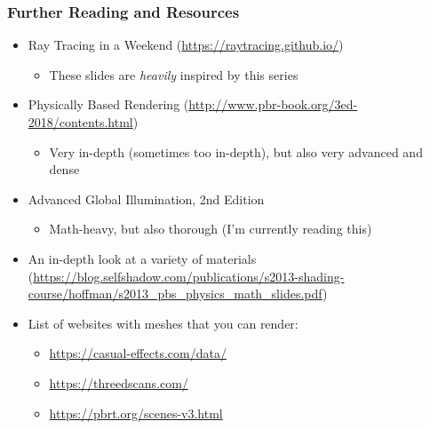\documentclass{beamer}
\begin{document}
\begin{frame}
	\frametitle{Further Reading and Resources}
	
	\begin{itemize}
		\item Ray Tracing in a Weekend (\url{https://raytracing.github.io/})
		\begin{itemize}
			\item These slides are \textit{heavily} inspired by this series
		\end{itemize}
		\item Physically Based Rendering (\url{http://www.pbr-book.org/3ed-2018/contents.html})
		\begin{itemize}
			\item Very in-depth (sometimes too in-depth), but also very advanced and dense
		\end{itemize}
		\item Advanced Global Illumination, 2nd Edition
		\begin{itemize}
			\item Math-heavy, but also thorough (I'm currently reading this)
		\end{itemize}
		\item An in-depth look at a variety of materials (\url{https://blog.selfshadow.com/publications/s2013-shading-course/hoffman/s2013\_pbs\_physics\_math\_slides.pdf})
		\item List of websites with meshes that you can render:
		\begin{itemize}
			\item \url{https://casual-effects.com/data/}
			\item \url{https://threedscans.com/}
			\item \url{https://pbrt.org/scenes-v3.html}
		\end{itemize}
	\end{itemize}	
\end{frame}
\end{document}
